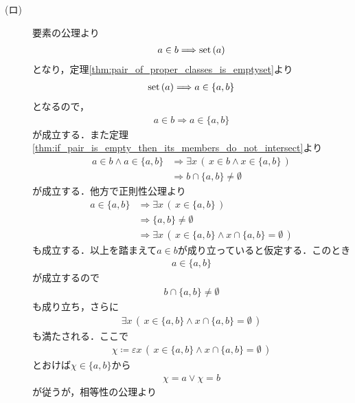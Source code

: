 \begin{prf}
\begin{description}
			\item[(ロ)]
				要素の公理より
				\begin{align}
					a \in b \Longrightarrow \operatorname*{set} \left(a\right)
				\end{align}
				となり，定理\ref{thm:pair_of_proper_classes_is_emptyset}より
				\begin{align}
					\operatorname*{set} \left(a\right) \Longrightarrow a \in \{a,b\}
				\end{align}
				となるので，
				\begin{align}
					a \in b \Longrightarrow a \in \{a,b\}
				\end{align}
				が成立する．また定理\ref{thm:if_pair_is_empty_then_its_members_do_not_intersect}より
				\begin{align}
					a \in b \wedge a \in \{a,b\} 
					&\Longrightarrow \exists x\, \left(\, x \in b \wedge x \in \{a,b\}\, \right) \\
					&\Longrightarrow b \cap \{a,b\} \neq \emptyset
				\end{align}
				が成立する．他方で正則性公理より
				\begin{align}
					a \in \{a,b\} &\Longrightarrow \exists x\, \left(\, x \in \{a,b\}\, \right) \\
					&\Longrightarrow \{a,b\} \neq \emptyset \\
					&\Longrightarrow \exists x\, \left(\, x \in \{a,b\} \wedge x \cap \{a,b\} = \emptyset\, \right)
				\end{align}
				も成立する．以上を踏まえて$a \in b$が成り立っていると仮定する．このとき
				\begin{align}
					a \in \{a,b\}
				\end{align}
				が成立するので
				\begin{align}
					b \cap \{a,b\} \neq \emptyset
				\end{align}
				も成り立ち，さらに
				\begin{align}
					\exists x\, \left(\, x \in \{a,b\} \wedge x \cap \{a,b\} = \emptyset\, \right)
				\end{align}
				も満たされる．ここで
				\begin{align}
					\chi \coloneqq \varepsilon x\, \left(\, x \in \{a,b\} \wedge x \cap \{a,b\} = \emptyset\, \right)
				\end{align}
				とおけば$\chi \in \{a,b\}$から
				\begin{align}
					\chi = a \vee \chi = b
				\end{align}
				が従うが，相等性の公理より
				\begin{align}

\end{align}
\end{description}
\end{prf}
